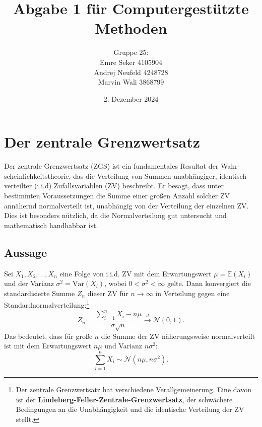\documentclass{article}
\begin{document}
\title{Abgabe 1 für Computergestützte Methoden}
\author{Gruppe 25: 
        \\Emre Seker 4105904
        \\Andrej Neufeld 4248728 
        \\Marvin Wali 3868799}

\date{2. Dezember 2024}

\maketitle
\newpage

\renewcommand{\contentsname}{Inhaltsverzeichnis}
\tableofcontents

\newpage
\section{Der zentrale Grenzwertsatz}
Der zentrale Grenzwertsatz (ZGS) ist ein fundamentales Resultat der Wahr-
scheinlichkeitstheorie, das die Verteilung von Summen unabhängiger, identisch verteilter (i.i.d) Zufallsvariablen (ZV) beschreibt.
Er besagt, dass unter bestimmten Voraussetzungen die Summe einer großen Anzahl solcher ZV annähernd normalverteilt ist, unabhängig von der Verteilung der einzelnen ZV. 
Dies ist besonders nützlich, da die Normalverteilung gut untersucht und mathematisch handhabbar ist.

\subsection{Aussage}
Sei $X_1,X_2,...,X_n$ eine Folge von i.i.d. ZV mit dem Erwartungswert $\mu =\mathbb{E}(X_i)$ und der Varianz $\sigma^2 = \text{Var}(X_i)$, wobei $0 < \sigma^2 < \infty$ gelte. Dann konvergiert die standardisierte Summe $Z_n$ dieser ZV für $n \rightarrow \infty$ in Verteilung gegen eine Standardnormalverteilung:\footnote[1]{Der zentrale Grenzwertsatz hat verschiedene Verallgemeinerung. Eine davon ist der \textbf{Lindeberg-Feller-Zentrale-Grenzwertsatz}\cite[Seite 328]{klenke}, der schwächere Bedingungen an die Unabhängigkeit und die identische Verteilung der ZV stellt.}
\begin{equation}
    \label{eq:ZGS}
    Z_n = \frac{\sum_{i=1}^n X_i -n\mu}{\sigma\sqrt{n}} \xrightarrow{d} \mathcal{N}(0,1). 
\end{equation}
Das bedeutet, dass für große $n$ die Summe der ZV näherungsweise normalverteilt ist mit dem Erwartungswert $n\mu$ und Varianz $n\sigma^2$:
\begin{equation}
    \label{eq:ZV}
    \sum_{i=1}^n X_i \sim \mathcal{N}(n\mu, n\sigma^2).
\end{equation}
\end{document}
